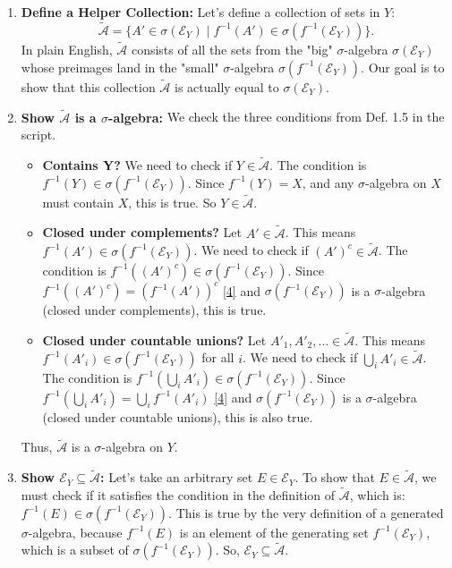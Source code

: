 \documentclass[11pt,a4paper]{article}
\theoremstyle{exercise_style}
\theoremstyle{definition}
\begin{document}
\begin{enumerate}
    \item \textbf{Define a Helper Collection:} Let's define a collection of sets in $Y$:
    \[
        \tilde{\mathcal{A}} = \{ A' \in \sigma(\mathcal{E}_Y) \mid f^{-1}(A') \in \sigma(f^{-1}(\mathcal{E}_Y)) \}.
    \]
    In plain English, $\tilde{\mathcal{A}}$ consists of all the sets from the "big" $\sigma$-algebra $\sigma(\mathcal{E}_Y)$ whose preimages land in the "small" $\sigma$-algebra $\sigma(f^{-1}(\mathcal{E}_Y))$. Our goal is to show that this collection $\tilde{\mathcal{A}}$ is actually equal to $\sigma(\mathcal{E}_Y)$.

    \item \textbf{Show $\tilde{\mathcal{A}}$ is a $\sigma$-algebra:} We check the three conditions from Def. 1.5 in the script.
        \begin{itemize}
            \item \textbf{Contains Y?} We need to check if $Y \in \tilde{\mathcal{A}}$. The condition is $f^{-1}(Y) \in \sigma(f^{-1}(\mathcal{E}_Y))$. Since $f^{-1}(Y) = X$, and any $\sigma$-algebra on $X$ must contain $X$, this is true. So $Y \in \tilde{\mathcal{A}}$.
            \item \textbf{Closed under complements?} Let $A' \in \tilde{\mathcal{A}}$. This means $f^{-1}(A') \in \sigma(f^{-1}(\mathcal{E}_Y))$. We need to check if $(A')^c \in \tilde{\mathcal{A}}$. The condition is $f^{-1}((A')^c) \in \sigma(f^{-1}(\mathcal{E}_Y))$. Since $f^{-1}((A')^c) = (f^{-1}(A'))^c$ \hyperlink{concept:preimage}{[4]} and $\sigma(f^{-1}(\mathcal{E}_Y))$ is a $\sigma$-algebra (closed under complements), this is true.
            \item \textbf{Closed under countable unions?} Let $A'_1, A'_2, \dots \in \tilde{\mathcal{A}}$. This means $f^{-1}(A'_i) \in \sigma(f^{-1}(\mathcal{E}_Y))$ for all $i$. We need to check if $\bigcup_i A'_i \in \tilde{\mathcal{A}}$. The condition is $f^{-1}(\bigcup_i A'_i) \in \sigma(f^{-1}(\mathcal{E}_Y))$. Since $f^{-1}(\bigcup_i A'_i) = \bigcup_i f^{-1}(A'_i)$ \hyperlink{concept:preimage}{[4]} and $\sigma(f^{-1}(\mathcal{E}_Y))$ is a $\sigma$-algebra (closed under countable unions), this is also true.
        \end{itemize}
    Thus, $\tilde{\mathcal{A}}$ is a $\sigma$-algebra on $Y$.

    \item \textbf{Show $\mathcal{E}_Y \subseteq \tilde{\mathcal{A}}$:} Let's take an arbitrary set $E \in \mathcal{E}_Y$. To show that $E \in \tilde{\mathcal{A}}$, we must check if it satisfies the condition in the definition of $\tilde{\mathcal{A}}$, which is: $f^{-1}(E) \in \sigma(f^{-1}(\mathcal{E}_Y))$. This is true by the very definition of a generated $\sigma$-algebra, because $f^{-1}(E)$ is an element of the generating set $f^{-1}(\mathcal{E}_Y)$, which is a subset of $\sigma(f^{-1}(\mathcal{E}_Y))$. So, $\mathcal{E}_Y \subseteq \tilde{\mathcal{A}}$.


\end{enumerate}
\end{document}
